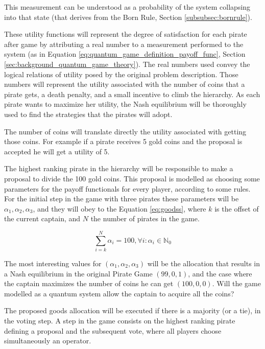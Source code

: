 This measurement can be understood as a probability of the system collapsing into that state (that derives from the Born Rule, Section \ref{subsubsec:bornrule}).


These utility functions will represent the degree of satisfaction for each pirate after game by attributing a real number to a measurement performed to the system (as in Equation \ref{eq:quantum_game_definition_payoff_func}, Section \ref{sec:background_quantum_game_theory}). 
The real numbers used convey the logical relations of utility posed by the original problem description. Those numbers will represent the utility associated with the number of coins that a pirate gets, a death penalty, and a small incentive to climb the hierarchy. As each pirate wants to maximize her utility, the Nash equilibrium will be thoroughly used to find the strategies that the pirates will adopt\cite{nash50}\cite{Nash51}.

The number of coins will translate directly the utility associated with getting those coins. For example if a pirate receives 5 gold coins and the proposal is accepted he will get a utility of 5. 

The highest ranking pirate in the hierarchy will be responsible to make a proposal to divide the 100 gold coins. This proposal is modelled as choosing some parameters for the payoff functionals for every player, according to some rules. For the initial step in the game with three pirates these parameters will be $\alpha_{1}, \alpha_{2}, \alpha_{3}$, and they will obey to the Equation \ref{eq:goodss}, where $k$ is the offset of the current captain, and $N$ the number of pirates in the game. 

\begin{equation}
\label{eq:goodss}
\sum_{i=k}^{N}\alpha_{i}=100, \forall i :\alpha_{i}\in\mathbb{N}_{0}
\end{equation}

The most interesting values for $(\alpha_{1}, \alpha_{2}, \alpha_{3})$ will be the allocation that results in a Nash equilibrium in the original Pirate Game $(99, 0, 1)$, and the case where the captain maximizes the number of coins he can get $(100, 0, 0)$. Will the game modelled as a quantum system allow the captain to acquire all the coins?

The proposed goods allocation will be executed if there is a majority (or a tie), in the voting step. A step in the game consists on the highest ranking pirate defining a proposal and the subsequent vote, where all players choose simultaneously an operator. 

